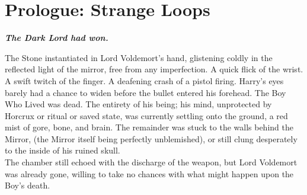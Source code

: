 \chapter*{Prologue: Strange Loops}

\textbf{\textit{The Dark Lord had won.}}\par
\simpleline



The Stone instantiated in Lord Voldemort’s hand, glistening coldly in the reflected light of the mirror, free from any imperfection.
\SmallVSpace
A quick flick of the wrist.
\SmallVSpace
A swift twitch of the finger.
\SmallVSpace
A deafening crash of a pistol firing.
\SmallVSpace
Harry’s eyes barely had a chance to widen before the bullet entered his forehead.
\SmallVSpace
The Boy Who Lived was dead.
\SmallVSpace
The entirety of his being; his mind, unprotected by Horcrux or ritual or saved state, was currently settling onto the ground, a red mist of gore, bone, and brain. The remainder was stuck to the walls behind the Mirror, (the Mirror itself being perfectly unblemished), or still clung desperately to the inside of his ruined skull.\\The chamber still echoed with the discharge of the weapon, but Lord Voldemort was already gone, willing to take no chances with what might happen upon the Boy’s death.

\simpleline


